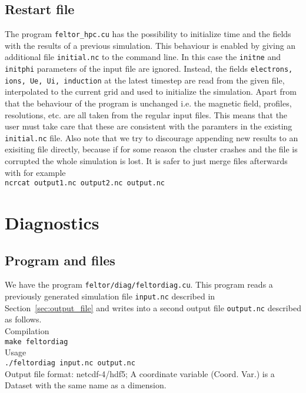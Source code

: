 \subsection{Restart file} \label{sec:restart_file}
The program \texttt{feltor\_hpc.cu} has the possibility to initialize time and the fields with
the results of a previous simulation. This behaviour is enabled by giving an additional file \texttt{initial.nc}
to the command line. In this case the \texttt{initne} and \texttt{initphi} parameters of the input
file are ignored. Instead, the fields \texttt{electrons, ions, Ue, Ui, induction} at the latest timestep
are read from the given file, interpolated to the current grid and used to initialize the simulation.
Apart from that the behaviour of the program is unchanged i.e. the magnetic field, profiles, resolutions, etc.
are all taken from the regular input files. This means that the user must take care that these are consistent
with the paramters in the existing \texttt{initial.nc} file. Also note that we try to discourage
appending new results to an exisiting file directly,
because if for some reason the cluster crashes and the file is corrupted
the whole simulation is lost. It is safer to just merge files afterwards with for example\\
\texttt{ncrcat output1.nc output2.nc output.nc}
\section{Diagnostics}\label{sec:diagnostics}
\subsection{Program and files}
We have the program \texttt{feltor/diag/feltordiag.cu}.
This program reads a previously generated simulation file \texttt{input.nc} described in Section~\ref{sec:output_file} and writes into a second output file \texttt{output.nc} described as follows. \\
Compilation\\
\texttt{make feltordiag} \\
Usage \\
\texttt{./feltordiag input.nc output.nc} \\

Output file format: netcdf-4/hdf5; A coordinate variable (Coord. Var.) is a Dataset with the same name as a dimension.

